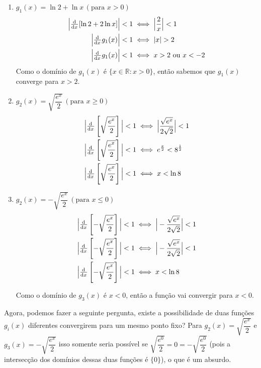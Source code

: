 \documentclass{article}
\begin{document}
  \begin{enumerate}
    \item $g_1(x) = \ln 2 + \ln x \, (\text{para } x > 0)$
    \begin{align*}
    \Big|\od{}{x}[\ln 2 + 2 \ln x]\Big| < 1 &\iff 
    \Big| \dfrac{2}{x} \Big| < 1
    \\
    \Big|\od{}{x} g_1(x)\Big| < 1 &\iff 
    |x| > 2
    \\
    \Big|\od{}{x} g_1(x)\Big| < 1 &\iff 
    x > 2 \text{ ou } x < -2    
    \end{align*}
    Como o domínio de $g_1(x)$ é $\{x \in \mathbb{R} : x > 0\}$, então sabemos que $g_1(x)$ converge para $x > 2$.    
    
    \item $g_2(x) = \sqrt{\dfrac{e^x}{2}} \, (\text{para } x \geq 0)$
    \begin{align*}
    \Big|\od{}{x}\left[\sqrt{\dfrac{e^x}{2}}\right]\Big| < 1 &\iff 
    \Big| \dfrac{\sqrt{e^x}}{2 \sqrt{2}} \Big| < 1
    \\
    \Big|\od{}{x}\left[\sqrt{\dfrac{e^x}{2}}\right]\Big| < 1 &\iff 
    e^{\frac{x}{2}} < 8^{\frac{1}{2}}
    \\
    \Big|\od{}{x}\left[\sqrt{\dfrac{e^x}{2}}\right]\Big| < 1 &\iff 
    x < \ln 8    
    \end{align*}
    
     \item $g_2(x) = -\sqrt{\dfrac{e^x}{2}} \, (\text{para } x \leq 0)$
    \begin{align*}
    \Big|\od{}{x}\left[-\sqrt{\dfrac{e^x}{2}}\right]\Big| < 1 &\iff 
    \Big|-\dfrac{\sqrt{e^x}}{2 \sqrt{2}} \Big| < 1
    \\
    \Big|\od{}{x}\left[-\sqrt{\dfrac{e^x}{2}}\right]\Big| < 1 &\iff 
    \Big|-\dfrac{\sqrt{e^x}}{2 \sqrt{2}} \Big| < 1
    \\
    \Big|\od{}{x}\left[-\sqrt{\dfrac{e^x}{2}}\right]\Big| < 1 &\iff 
    x < \ln 8    
    \end{align*}
    
    
    Como o domínio de $g_3(x)$ é $x < 0$, então a função vai convergir para $x < 0$.
  \end{enumerate}
  Agora, podemos fazer a seguinte pergunta, existe a possibilidade de duas funções $g_i(x)$ diferentes convergirem para um mesmo ponto fixo?
  Para $g_2(x) = \sqrt{\dfrac{e^x}{2}}$ e $g_3(x) =  - \sqrt{\dfrac{e^x}{2}}$ isso somente seria possível se $\sqrt{\dfrac{e^0}{2}} = 0 = -\sqrt{\dfrac{e^0}{2}}$ (pois a intersecção dos domínios dessas duas funções é $\{0\}$), o que é um absurdo.\\
\end{document}
